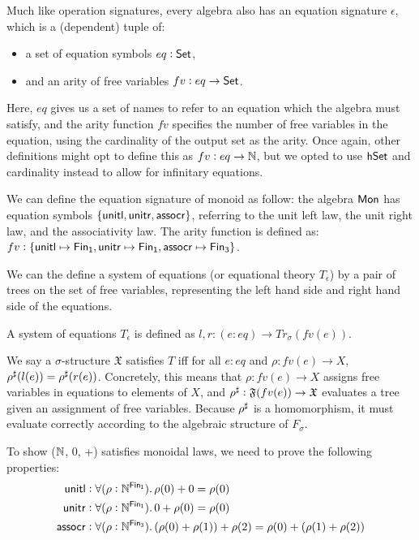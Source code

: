 Much like operation signatures, every algebra also has an equation signature
$\epsilon$, which is a (dependent) tuple of:
\begin{itemize}
    \item a set of equation symbols $eq : \mathsf{Set}$,
    \item and an arity of free variables $fv : eq \to \mathsf{Set}$.
\end{itemize}

Here, $eq$ gives us a set of names to refer to an equation which
the algebra must satisfy, and the arity function $fv$ specifies the 
number of free variables in the equation, using the cardinality of the
output set as the arity. Once again, other definitions might opt to
define this as $fv : eq \to \mathbb{N}$, but we opted to use $\mathsf{hSet}$ and
cardinality instead to allow for infinitary equations.

\begin{example}
We can define the equation signature of monoid as follow: the algebra
$\mathsf{Mon}$ has equation symbols $\{\operatorname{\mathsf{unitl}}, \operatorname{\mathsf{unitr}}, \operatorname{\mathsf{assocr}}\}$,
referring to the unit left law, the unit right law, and the associativity law.
The arity function is defined as:
$fv : \{ \term{unitl} \mapsto \Fin[1], \term{unitr} \mapsto \Fin[1], \term{assocr} \mapsto \Fin[3] \}$.
\end{example}

We can the define a system of equations (or equational theory $T_\epsilon$)
by a pair of trees on the set of free variables, representing the
left hand side and right hand side of the equations.
\begin{definition}
A system of equations $T_\epsilon$ is defined as
$l, r : (e : eq) \to Tr_\sigma(fv(e))$.
\end{definition}

We say a $\sigma$-structure $\mathfrak{X}$ satisfies $T$
iff for all $e : eq$ and
$\rho : fv(e) \to X$, ${\rho}^{\sharp}(l(e)) = {\rho}^{\sharp}(r(e))$.
Concretely, this means that $\rho : fv(e) \to X$ assigns
free variables in equations to elements of $X$, and
${\rho}^{\sharp} : \mathfrak{F}(fv(e)) \to \mathfrak{X}$ evaluates
a tree given an assignment of free variables. Because ${\rho}^{\sharp}$
is a homomorphism, it must evaluate correctly according to the
algebraic structure of $F_\sigma$.

\begin{example}
To show ($\mathbb{N}$, 0, +) satisfies monoidal laws, we need to prove
the following properties:
\begin{align*}
\term{unitl}  & : \forall (\rho : \Nat^{\Fin[1]}). \, \rho(0) + 0 \id \rho(0) \\
\term{unitr}  & : \forall (\rho : \Nat^{\Fin[1]}). \, 0 + \rho(0) \id \rho(0) \\
\term{assocr} & : \forall (\rho : \Nat^{\Fin[3]}). \, (\rho(0) + \rho(1)) + \rho(2) \id \rho(0) + (\rho(1) + \rho(2))
\end{align*} 
\end{example}

